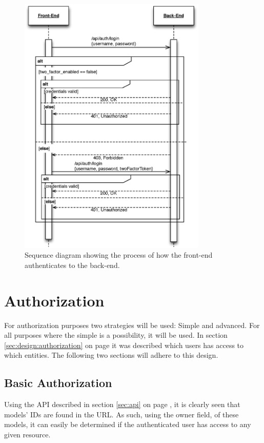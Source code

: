 		\begin{figure}[p]
			\centering
			\includegraphics[width=0.8\textwidth]{figures/implementation/uml/sequence/authentication.eps}
			\caption{Sequence diagram showing the process of how the front-end authenticates to the back-end.}
			\label{fig:sequence:auth}
		\end{figure}

	\section{Authorization}
		For authorization purposes two strategies will be used: Simple and advanced. For all purposes where the simple is a possibility, it will be used. In section \ref{sec:design:authorization} on page \pageref{sec:design:authorization} it was described which users has access to which entities. The following two sections will adhere to this design.

		\subsection{Basic Authorization}
			Using the API described in section \ref{sec:api} on page \pageref{sec:api}, it is clearly seen that models' IDs are found in the URL. As such, using the owner field, of these models, it can easily be determined if the authenticated user has access to any given resource.

